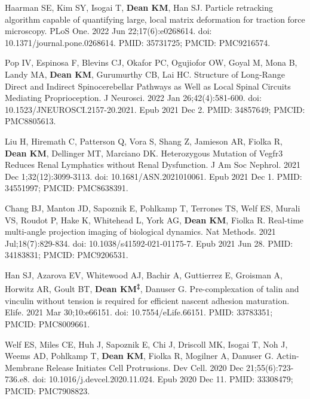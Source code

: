 \begin{etaremune}
\item Haarman SE, Kim SY, Isogai T, \textbf{Dean KM}, Han SJ. Particle retracking algorithm capable of quantifying large, local matrix deformation for traction force microscopy. PLoS One. 2022 Jun 22;17(6):e0268614. doi: 10.1371/journal.pone.0268614. PMID: 35731725; PMCID: PMC9216574.

\item Pop IV, Espinosa F, Blevins CJ, Okafor PC, Ogujiofor OW, Goyal M, Mona B, Landy MA, \textbf{Dean KM}, Gurumurthy CB, Lai HC. Structure of Long-Range Direct and Indirect Spinocerebellar Pathways as Well as Local Spinal Circuits Mediating Proprioception. J Neurosci. 2022 Jan 26;42(4):581-600. doi: 10.1523/JNEUROSCI.2157-20.2021. Epub 2021 Dec 2. PMID: 34857649; PMCID: PMC8805613.

\item Liu H, Hiremath C, Patterson Q, Vora S, Shang Z, Jamieson AR, Fiolka R, \textbf{Dean KM}, Dellinger MT, Marciano DK. Heterozygous Mutation of Vegfr3 Reduces Renal Lymphatics without Renal Dysfunction. J Am Soc Nephrol. 2021 Dec 1;32(12):3099-3113. doi: 10.1681/ASN.2021010061. Epub 2021 Dec 1. PMID: 34551997; PMCID: PMC8638391.

\item Chang BJ, Manton JD, Sapoznik E, Pohlkamp T, Terrones TS, Welf ES, Murali VS, Roudot P, Hake K, Whitehead L, York AG, \textbf{Dean KM}, Fiolka R. Real-time multi-angle projection imaging of biological dynamics. Nat Methods. 2021 Jul;18(7):829-834. doi: 10.1038/s41592-021-01175-7. Epub 2021 Jun 28. PMID: 34183831; PMCID: PMC9206531.

\item Han SJ, Azarova EV, Whitewood AJ, Bachir A, Guttierrez E, Groisman A, Horwitz AR, Goult BT, \textbf{Dean KM\textsuperscript{‡}}, Danuser G. Pre-complexation of talin and vinculin without tension is required for efficient nascent adhesion maturation. Elife. 2021 Mar 30;10:e66151. doi: 10.7554/eLife.66151. PMID: 33783351; PMCID: PMC8009661.

\item Welf ES, Miles CE, Huh J, Sapoznik E, Chi J, Driscoll MK, Isogai T, Noh J, Weems AD, Pohlkamp T, \textbf{Dean KM}, Fiolka R, Mogilner A, Danuser G. Actin-Membrane Release Initiates Cell Protrusions. Dev Cell. 2020 Dec 21;55(6):723-736.e8. doi: 10.1016/j.devcel.2020.11.024. Epub 2020 Dec 11. PMID: 33308479; PMCID: PMC7908823.


\end{etaremune}
